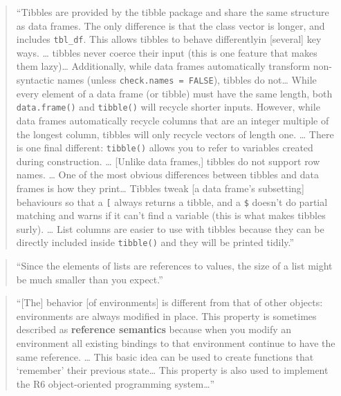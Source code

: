 \documentclass[]{tufte-book}
\begin{document}
\begin{quote}
``Tibbles are provided by the tibble package and share the same structure as data
frames. The only difference is that the class vector is longer, and includes \texttt{tbl\_df}.
This allows tibbles to behave differentlyin {[}several{]} key ways. \ldots{} tibbles never
coerce their input (this is one feature that makes them lazy)\ldots{} Additionally, while
data frames automatically transform non-syntactic names (unless \texttt{check.names\ =\ FALSE}),
tibbles do not\ldots{} While every element of a data frame (or tibble) must have the
same length, both \texttt{data.frame()} and \texttt{tibble()} will recycle shorter inputs. However,
while data frames automatically recycle columns that are an integer multiple of the
longest column, tibbles will only recycle vectors of length one. \ldots{} There is one
final different: \texttt{tibble()} allows you to refer to variables created during
construction. \ldots{} {[}Unlike data frames,{]} tibbles do not support row names. \ldots{} One
of the most obvious differences between tibbles and data frames is how they
print\ldots{} Tibbles tweak {[}a data frame's subsetting{]} behaviours so that a \texttt{{[}} always
returns a tibble, and a \texttt{\$} doesn't do partial matching and warns if it can't find
a variable (this is what makes tibbles surly). \ldots{} List columns are easier to use
with tibbles because they can be directly included inside \texttt{tibble()} and they
will be printed tidily.'' \citep{wickham2019advanced}
\end{quote}

\begin{quote}
``Since the elements of lists are references to values, the size of a list might
be much smaller than you expect.'' \citep{wickham2019advanced}
\end{quote}

\begin{quote}
``{[}The{]} behavior {[}of environments{]} is different from that of other objects:
environments are always modified in place. This property is sometimes described
as \textbf{reference semantics} because when you modify an environment all existing
bindings to that environment continue to have the same reference. \ldots{} This
basic idea can be used to create functions that `remember' their previous
state\ldots{} This property is also used to implement the R6 object-oriented
programming system\ldots{}'' \citep{wickham2019advanced}
\end{quote}
\end{document}
